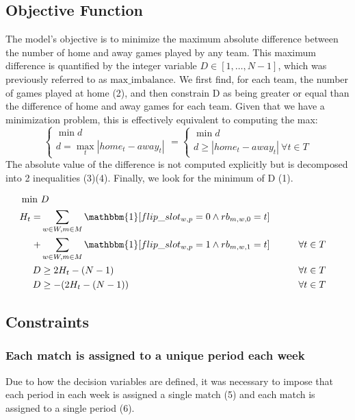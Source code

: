 \subsection{Objective Function}
The model's objective is to minimize the maximum absolute difference between the number of home and away games played by any team. This maximum difference is quantified by the integer variable $D \in [1, \dots, N-1]$, which was previously referred to as $\text{max\_imbalance}$. We first find, for each team, the number of games played at home (2), and then constrain D as being greater or equal than the difference of home and away games for each team. Given that we have a minimization problem, this is effectively equivalent to computing the max: 
$$\begin{cases}
    \min d \\
    d = \max_t |home_t - away_t|
\end{cases} = \begin{cases}
    \min d \\
    d \geq |home_t - away_t| \ \forall t \in T
\end{cases}$$The absolute value of the difference is not computed explicitly but is decomposed into 2 inequalities (3)(4). Finally, we look for the minimum of D (1).

\begin{align}
    \min \ &D \\
    H_t =& \sum_{w \in W, m \in M} \mathbbm{1}[flip\_slot_{w,p} = 0 \land rb_{m,w,0} = t] \notag \\
    +& \sum_{w \in W, m \in M} \mathbbm{1}[flip\_slot_{w,p} = 1 \land rb_{m, w,1} = t] \hspace{20px}  && \forall t \in T\\
    D &\geq 2H_t - (N-1) && \forall t \in T\\
    D & \geq -(2 H_t - (N-1)) && \forall t \in T
\end{align}

\subsection{Constraints}
\subsubsection{Each match is assigned to a unique period each week}
Due to how the decision variables are defined, it was necessary to impose that each period in each week is assigned a single match (5) and each match is assigned to a single period (6).

